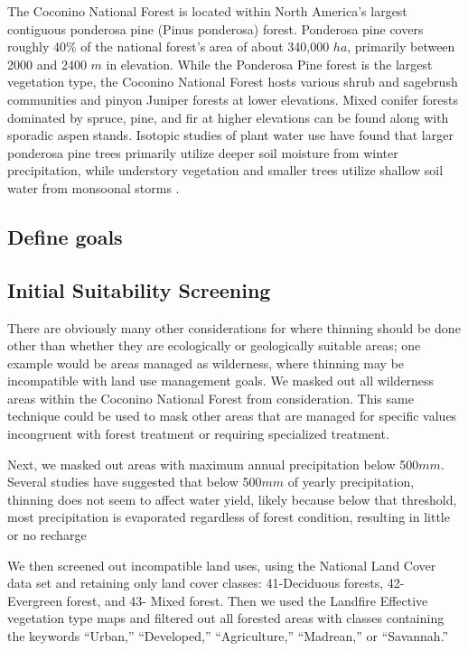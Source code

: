 \documentclass[
  number]{elsarticle}
\begin{document}
The Coconino National Forest is located within North America's largest
contiguous ponderosa pine (Pinus ponderosa) forest. Ponderosa pine
covers roughly 40\% of the national forest's area of about 340,000
\(ha\), primarily between 2000 and 2400 \(m\) in elevation. While the
Ponderosa Pine forest is the largest vegetation type, the Coconino
National Forest hosts various shrub and sagebrush communities and pinyon
Juniper forests at lower elevations. Mixed conifer forests dominated by
spruce, pine, and fir at higher elevations can be found along with
sporadic aspen stands. Isotopic studies of plant water use have found
that larger ponderosa pine trees primarily utilize deeper soil moisture
from winter precipitation, while understory vegetation and smaller trees
utilize shallow soil water from monsoonal storms
\citep{kerhoulas2013, kerhoulas2023}.

\subsection{Define goals}\label{define-goals}

\subsection{Initial Suitability
Screening}\label{initial-suitability-screening}

There are obviously many other considerations for where thinning should
be done other than whether they are ecologically or geologically
suitable areas; one example would be areas managed as wilderness, where
thinning may be incompatible with land use management goals. We masked
out all wilderness areas within the Coconino National Forest from
consideration. This same technique could be used to mask other areas
that are managed for specific values incongruent with forest treatment
or requiring specialized treatment.

Next, we masked out areas with maximum annual precipitation below
500\(mm\). Several studies have suggested that below 500\(mm\) of yearly
precipitation, thinning does not seem to affect water yield, likely
because below that threshold, most precipitation is evaporated
regardless of forest condition, resulting in little or no recharge
\citep{bosch1982, hibbert1979b, adams2012a, biederman2022a}

We then screened out incompatible land uses, using the National Land
Cover data set and retaining only land cover classes: 41-Deciduous
forests, 42- Evergreen forest, and 43- Mixed forest. Then we used the
Landfire Effective vegetation type maps and filtered out all forested
areas with classes containing the keywords ``Urban,'' ``Developed,''
``Agriculture,'' ``Madrean,'' or ``Savannah.''
\end{document}
